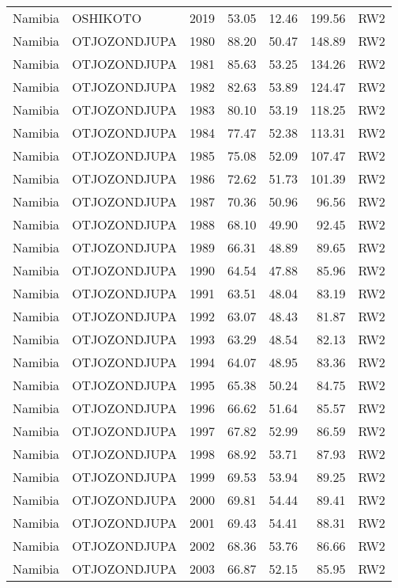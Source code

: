 \begin{longtable}{lllrrrl}
  Namibia & OSHIKOTO & 2019 & 53.05 & 12.46 & 199.56 & RW2 \\ 
  Namibia & OTJOZONDJUPA & 1980 & 88.20 & 50.47 & 148.89 & RW2 \\ 
  Namibia & OTJOZONDJUPA & 1981 & 85.63 & 53.25 & 134.26 & RW2 \\ 
  Namibia & OTJOZONDJUPA & 1982 & 82.63 & 53.89 & 124.47 & RW2 \\ 
  Namibia & OTJOZONDJUPA & 1983 & 80.10 & 53.19 & 118.25 & RW2 \\ 
  Namibia & OTJOZONDJUPA & 1984 & 77.47 & 52.38 & 113.31 & RW2 \\ 
  Namibia & OTJOZONDJUPA & 1985 & 75.08 & 52.09 & 107.47 & RW2 \\ 
  Namibia & OTJOZONDJUPA & 1986 & 72.62 & 51.73 & 101.39 & RW2 \\ 
  Namibia & OTJOZONDJUPA & 1987 & 70.36 & 50.96 & 96.56 & RW2 \\ 
  Namibia & OTJOZONDJUPA & 1988 & 68.10 & 49.90 & 92.45 & RW2 \\ 
  Namibia & OTJOZONDJUPA & 1989 & 66.31 & 48.89 & 89.65 & RW2 \\ 
  Namibia & OTJOZONDJUPA & 1990 & 64.54 & 47.88 & 85.96 & RW2 \\ 
  Namibia & OTJOZONDJUPA & 1991 & 63.51 & 48.04 & 83.19 & RW2 \\ 
  Namibia & OTJOZONDJUPA & 1992 & 63.07 & 48.43 & 81.87 & RW2 \\ 
  Namibia & OTJOZONDJUPA & 1993 & 63.29 & 48.54 & 82.13 & RW2 \\ 
  Namibia & OTJOZONDJUPA & 1994 & 64.07 & 48.95 & 83.36 & RW2 \\ 
  Namibia & OTJOZONDJUPA & 1995 & 65.38 & 50.24 & 84.75 & RW2 \\ 
  Namibia & OTJOZONDJUPA & 1996 & 66.62 & 51.64 & 85.57 & RW2 \\ 
  Namibia & OTJOZONDJUPA & 1997 & 67.82 & 52.99 & 86.59 & RW2 \\ 
  Namibia & OTJOZONDJUPA & 1998 & 68.92 & 53.71 & 87.93 & RW2 \\ 
  Namibia & OTJOZONDJUPA & 1999 & 69.53 & 53.94 & 89.25 & RW2 \\ 
  Namibia & OTJOZONDJUPA & 2000 & 69.81 & 54.44 & 89.41 & RW2 \\ 
  Namibia & OTJOZONDJUPA & 2001 & 69.43 & 54.41 & 88.31 & RW2 \\ 
  Namibia & OTJOZONDJUPA & 2002 & 68.36 & 53.76 & 86.66 & RW2 \\ 
  Namibia & OTJOZONDJUPA & 2003 & 66.87 & 52.15 & 85.95 & RW2 \\ 

\end{longtable}
